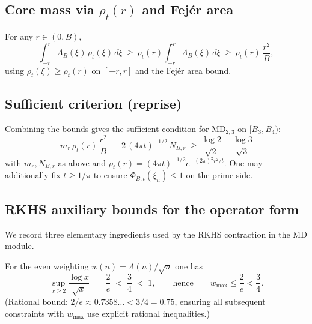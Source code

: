 \subsection{Core mass via \texorpdfstring{$\rho_t(r)$}{ρₜ(r)} and Fejér area}
For any $r\in(0,B)$,
\begin{equation}\label{eq:MD_2_3_constants-formula-6}
 \int_{-r}^{r}\!\Lambda_B(\xi)\,\rho_t(\xi)\,d\xi\ \ge\ \rho_t(r)\int_{-r}^{r}\!\Lambda_B(\xi)\,d\xi\ \ge\ \rho_t(r)\,\frac{r^2}{B},
\end{equation}
using $\rho_t(\xi)\ge \rho_t(r)$ on $[-r,r]$ and the Fej\'er area bound.

\subsection{Sufficient criterion (reprise)}
Combining the bounds gives the sufficient condition for MD$_{2,3}$ on $[B_3,B_4)$:
\begin{equation}\label{eq:MD_2_3_constants-formula-5}
\boxed{\ m_r\,\rho_t(r)\,\frac{r^2}{B}\ -\ 2\,(4\pi t)^{-1/2}\,N_{B,r}\ \ge\ \frac{\log 2}{\sqrt 2}+\frac{\log 3}{\sqrt 3}\, }
\end{equation}
with $m_r, N_{B,r}$ as above and $\rho_t(r)=(4\pi t)^{-1/2} e^{-(2\pi)^2 r^2/t}$. One may additionally fix $t\ge 1/\pi$ to ensure $\Phi_{B,t}(\xi_n)\le1$ on the prime side.

\subsection{RKHS auxiliary bounds for the operator form}

We record three elementary ingredients used by the RKHS contraction in the MD module.

\begin{lemma}\label{md:lem:weight-cap}
For the even weighting $w(n)=\Lambda(n)/\sqrt{n}$ one has
\begin{equation}\label{eq:MD_2_3_constants-formula-1}
\sup_{x\ge 2}\frac{\log x}{\sqrt{x}}\;=\;\frac{2}{e}\;<\;\frac{3}{4}\;<\;1,\qquad\text{hence}\qquad w_{\max}\le \frac{2}{e}< \frac{3}{4}.
\end{equation}
(Rational bound: $2/e\approx 0.7358\ldots < 3/4 = 0.75$, ensuring all subsequent constraints with $w_{\max}$ use explicit rational inequalities.)
\end{lemma}


